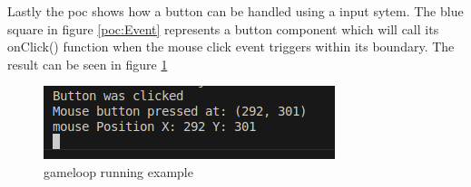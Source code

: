 \documentclass{projdoc}
\begin{document}
Lastly the \gls{poc} shows how a button can be handled using a input sytem.
The blue square in figure \ref{poc:Event} represents a button component which will call its onClick() function when the mouse click event triggers within its boundary.
The result can be seen in figure \ref{fig:poc-event-button}
\begin{figure}
	\centering
	\includegraphics[scale=1]{img/poc-event-button.png}
	\caption{gameloop running example}
	\label{fig:poc-event-button}
\end{figure}
\end{document}
